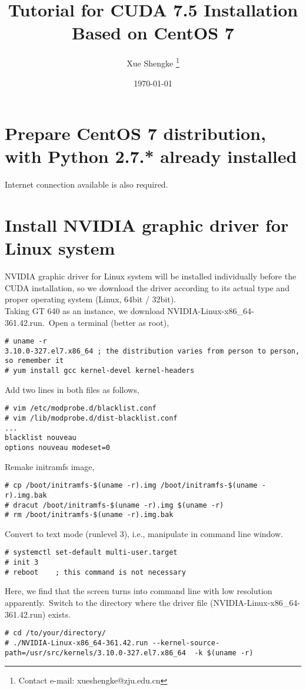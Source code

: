 \documentclass[UTF8,a4paper,12pt]{article}
\title{Tutorial for CUDA 7.5 Installation \\ Based on CentOS 7}
\author{ Xue Shengke \thanks{Contact e-mail: xueshengke@zju.edu.cn} }
\date{\today}
\begin{document}
\maketitle

\section{Prepare CentOS 7 distribution, with Python 2.7.* already installed}
Internet connection available is also required.

\section{Install NVIDIA graphic driver for Linux system}
NVIDIA graphic driver for Linux system will be installed individually before the CUDA installation, so we download the driver according to its actual type and proper operating system (Linux, 64bit / 32bit). \\
Taking GT 640 as an instance, we download NVIDIA-Linux-x86\_64-361.42.run.~Open a terminal (better as root),
\begin{lstlisting}
# uname -r
3.10.0-327.el7.x86_64 ; the distribution varies from person to person, so remember it 
# yum install gcc kernel-devel kernel-headers
\end{lstlisting}
Add two lines in both files as follows,
\begin{lstlisting}
# vim /etc/modprobe.d/blacklist.conf
# vim /lib/modprobe.d/dist-blacklist.conf
...
blacklist nouveau
options nouveau modeset=0
\end{lstlisting}
Remake initramfs image,
\begin{lstlisting}
# cp /boot/initramfs-$(uname -r).img /boot/initramfs-$(uname -r).img.bak
# dracut /boot/initramfs-$(uname -r).img $(uname -r)
# rm /boot/initramfs-$(uname -r).img.bak
\end{lstlisting}
Convert to text mode (runlevel 3), i.e., manipulate in command line window.
\begin{lstlisting}
# systemctl set-default multi-user.target
# init 3
# reboot	; this command is not necessary
\end{lstlisting}
Here, we find that the screen turns into command line with low resolution  apparently.~Switch to the directory where the driver file (NVIDIA-Linux-x86\_64-361.42.run) exists.
\begin{lstlisting}
# cd /to/your/directory/
# ./NVIDIA-Linux-x86_64-361.42.run --kernel-source-path=/usr/src/kernels/3.10.0-327.el7.x86_64  -k $(uname -r)
\end{lstlisting}
\end{document}
